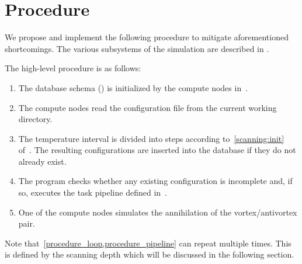\section{Procedure}
	We propose and implement the following procedure to mitigate aforementioned shortcomings. The various subsystems of the simulation are described in .
	
	The high-level procedure is as follows:
	\begin{enumerate}
		\item The database schema () is initialized by the compute nodes in~.
		\item The compute nodes read the configuration file from the current working directory.
		\item \label{procedure_loop} The temperature interval is divided into steps according to~\cref{scanning:init} of~. The resulting configurations are inserted into the database if they do not already exist.
		\item \label{procedure_pipeline} The program checks whether any existing configuration is incomplete and, if so, executes the task pipeline defined in~.
		\item One of the compute nodes simulates the annihilation of the vortex/antivortex pair.
	\end{enumerate}
	Note that~\cref{procedure_loop,procedure_pipeline} can repeat multiple times. This is defined by the scanning depth which will be discussed in the following section.

